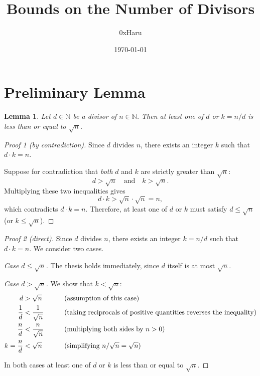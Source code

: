 \documentclass[12pt]{article}
\title{\textbf{Bounds on the Number of Divisors}}
\author{0xHaru}
\date{\today}
\newtheorem{lemma}{Lemma}
\theoremstyle{remark}
\begin{document}
\maketitle

\section*{Preliminary Lemma}

\begin{lemma}
Let $d \in \mathbb{N}$ be a divisor of $n \in \mathbb{N}$.  Then at least one of $d$
or $k = n/d$ is less than or equal to $\sqrt{n}$.
\end{lemma}

\begin{proof}[Proof 1 (by contradiction)]
Since $d$ divides $n$, there exists an integer $k$ such that $d \cdot k = n$.

Suppose for contradiction that \emph{both} $d$ and $k$ are strictly greater
than $\sqrt{n}$:
\[
    d > \sqrt{n} \quad \text{and} \quad k > \sqrt{n}.
\]
Multiplying these two inequalities gives
\[
    d \cdot k > \sqrt{n} \cdot \sqrt{n} = n,
\]
which contradicts $d \cdot k = n$.  Therefore, at least one of $d$ or $k$
must satisfy $d \leq \sqrt{n}$ (or $k \leq \sqrt{n}$).
\end{proof}

\smallskip

\begin{proof}[Proof 2 (direct)]
Since $d$ divides $n$, there exists an integer $k = n/d$ such that
$d \cdot k = n$.  We consider two cases.

\medskip
\noindent\textit{Case $d \leq \sqrt{n}$.}\;
The thesis holds immediately, since $d$ itself is at most $\sqrt{n}$.

\medskip
\noindent\textit{Case $d > \sqrt{n}$.}\;
We show that $k < \sqrt{n}$:
\begin{alignat}{2}
    d &> \sqrt{n}
        &\qquad& \text{(assumption of this case)} \notag \\
    \frac{1}{d} &< \frac{1}{\sqrt{n}}
        &\qquad& \text{(taking reciprocals of positive quantities reverses the inequality)} \notag \\
    \frac{n}{d} &< \frac{n}{\sqrt{n}}
        &\qquad& \text{(multiplying both sides by $n > 0$)} \notag \\
    k = \frac{n}{d} &< \sqrt{n}
        &\qquad& \text{(simplifying $n/\sqrt{n} = \sqrt{n}$)} \notag
\end{alignat}

\medskip
\noindent In both cases at least one of $d$ or $k$ is less than or equal to
$\sqrt{n}$.
\end{proof}
\end{document}

